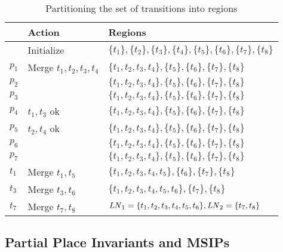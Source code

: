 \documentclass[a4paper,10pt,twoside,openright]{memoir}
\newcommand*{\LN}{\textnormal{\emph{LN}}}
\begin{document}
\begin{table}
  {\centering
    \begin{tabular}{@{}lll@{}}
      \toprule
      & Action & Regions \\
      \midrule
      & Initialize & $\{t_1\}, \{t_2\}, \{t_3\}, \{t_4\}, \{t_5\},
                     \{t_6\}, \{t_7\}, \{t_8\}$ \\[0.5em]
      $p_1$ & Merge $t_1, t_2, t_3, t_4$ & $\{t_1, t_2, t_3, t_4\}, \{t_5\},
                     \{t_6\}, \{t_7\}, \{t_8\}$ \\
      $p_2$ & & $\{t_1, t_2, t_3, t_4\}, \{t_5\},
                     \{t_6\}, \{t_7\}, \{t_8\}$ \\
      $p_3$ & & $\{t_1, t_2, t_3, t_4\}, \{t_5\},
                     \{t_6\}, \{t_7\}, \{t_8\}$ \\
      $p_4$ & $t_1, t_3$ ok & $\{t_1, t_2, t_3, t_4\}, \{t_5\},
                     \{t_6\}, \{t_7\}, \{t_8\}$ \\
      $p_5$ & $t_2, t_4$ ok & $\{t_1, t_2, t_3, t_4\}, \{t_5\},
                     \{t_6\}, \{t_7\}, \{t_8\}$ \\
      $p_6$ & & $\{t_1, t_2, t_3, t_4\}, \{t_5\},
                     \{t_6\}, \{t_7\}, \{t_8\}$ \\
      $p_7$ & & $\{t_1, t_2, t_3, t_4\}, \{t_5\},
                     \{t_6\}, \{t_7\}, \{t_8\}$ \\[0.5em]
      $t_1$ & Merge $t_1, t_5$ & $\{t_1, t_2, t_3, t_4, t_5\},
                     \{t_6\}, \{t_7\}, \{t_8\}$ \\
      $t_3$ & Merge $t_3, t_6$ & $\{t_1, t_2, t_3, t_4, t_5, t_6\},
                     \{t_7\}, \{t_8\}$ \\[0.5em]
      $t_7$ & Merge $t_7, t_8$ & $\LN_1 = \{t_1, t_2, t_3, t_4, t_5, t_6\},
                     \LN_2 = \{t_7, t_8\}$ \\
      \bottomrule
    \end{tabular}
    \par}
  \caption{Partitioning the set of transitions into regions}
  \label{tbl:example:partition}
\end{table}

\subsection{Partial Place Invariants and MSIPs}
\end{document}
